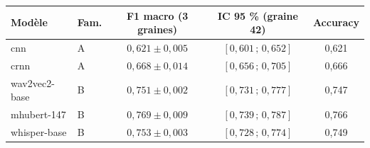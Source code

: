 \begin{tabular}{@{}llccc@{}}
\toprule
Modèle & Fam. & F1 macro (3 graines) & IC 95 \% (graine 42) & Accuracy \\
\midrule
cnn & A & $0{,}621 \pm 0{,}005$ & $[0{,}601\,;\,0{,}652]$ & 0{,}621 \\
crnn & A & $0{,}668 \pm 0{,}014$ & $[0{,}656\,;\,0{,}705]$ & 0{,}666 \\
wav2vec2-base & B & $0{,}751 \pm 0{,}002$ & $[0{,}731\,;\,0{,}777]$ & 0{,}747 \\
mhubert-147 & B & $0{,}769 \pm 0{,}009$ & $[0{,}739\,;\,0{,}787]$ & 0{,}766 \\
whisper-base & B & $0{,}753 \pm 0{,}003$ & $[0{,}728\,;\,0{,}774]$ & 0{,}749 \\
\bottomrule
\end{tabular}
